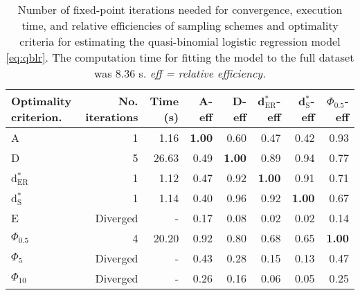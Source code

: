 \begin{table}[htb!]
\centering
\caption{Number of fixed-point iterations needed for convergence, execution time, and relative efficiencies of sampling schemes and optimality criteria for estimating the quasi-binomial logistic regression model \eqref{eq:qblr}. The computation time for fitting the model to the full dataset was 8.36 s. \textit{eff = relative efficiency.}} 
\label{tab:impact_speed_response_surface}
\begin{tabular}{lrrrrrrr}
 Optimality criterion. & No. iterations & Time (s) & A-eff & D-eff & d$^*_{\mathrm{ER}}$-eff & d$^*_{\mathrm{S}}$-eff & $\Phi_{0.5}$-eff \\ 
  \hline
A & 1 & 1.16 & \textbf{1.00} & 0.60 & 0.47 & 0.42 & 0.93 \\ 
  D & 5 & 26.63 & 0.49 & \textbf{1.00} & 0.89 & 0.94 & 0.77 \\ 
  d$^*_{\mathrm{ER}}$ & 1 & 1.12 & 0.47 & 0.92 & \textbf{1.00} & 0.91 & 0.71 \\ 
  d$^*_{\mathrm{S}}$ & 1 & 1.14 & 0.40 & 0.96 & 0.92 & \textbf{1.00} & 0.67 \\ 
  E & Diverged & - & 0.17 & 0.08 & 0.02 & 0.02 & 0.14 \\ 
  $\Phi_{0.5}$ & 4 & 20.20 & 0.92 & 0.80 & 0.68 & 0.65 & \textbf{1.00} \\ 
  $\Phi_5$ & Diverged & - & 0.43 & 0.28 & 0.15 & 0.13 & 0.47 \\ 
  $\Phi_{10}$ & Diverged & - & 0.26 & 0.16 & 0.06 & 0.05 & 0.25 \\ 
   \hline
\end{tabular}
\end{table}
